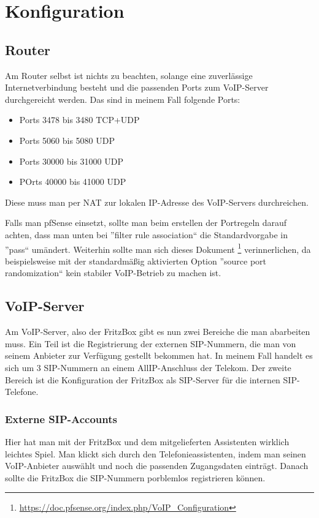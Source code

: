 \documentclass[a4paper,12pt]{scrbook}
\begin{document}
\chapter{Konfiguration}
\section{Router}
Am Router selbst ist nichts zu beachten, solange eine zuverlässige Internetverbindung besteht und die passenden Ports zum VoIP-Server durchgereicht werden.
Das sind in meinem Fall folgende Ports:
\begin{itemize}
 \item Ports 3478 bis 3480 TCP+UDP
 \item Ports 5060 bis 5080 UDP
 \item Ports 30000 bis 31000 UDP
 \item POrts 40000 bis 41000 UDP
\end{itemize}

Diese muss man per NAT zur lokalen IP-Adresse des VoIP-Servers durchreichen.


Falls man pfSense einsetzt, sollte man beim erstellen der Portregeln darauf achten, dass man 
unten bei ''filter rule association`` die Standardvorgabe in ''pass`` umändert. Weiterhin sollte man sich
dieses Dokument \footnote{\url{https://doc.pfsense.org/index.php/VoIP_Configuration}} verinnerlichen, da
beispielsweise mit der standardmäßig aktivierten Option ''source port randomization`` kein stabiler VoIP-Betrieb 
zu machen ist.


\section{VoIP-Server}
Am VoIP-Server, also der FritzBox gibt es nun zwei Bereiche die man abarbeiten muss. Ein Teil ist die Registrierung der externen SIP-Nummern,
die man von seinem Anbieter zur Verfügung gestellt bekommen hat. In meinem Fall handelt es sich um 3 SIP-Nummern an einem AllIP-Anschluss der Telekom.
Der zweite Bereich ist die Konfiguration der FritzBox als SIP-Server für die internen SIP-Telefone.

\subsection{Externe SIP-Accounts}
Hier hat man mit der FritzBox und dem mitgelieferten Assistenten wirklich leichtes Spiel. Man klickt sich durch den Telefonieassistenten, indem man seinen 
VoIP-Anbieter auswählt und noch die passenden Zugangsdaten einträgt. Danach sollte die FritzBox die SIP-Nummern porblemlos registrieren können. 
\end{document}
